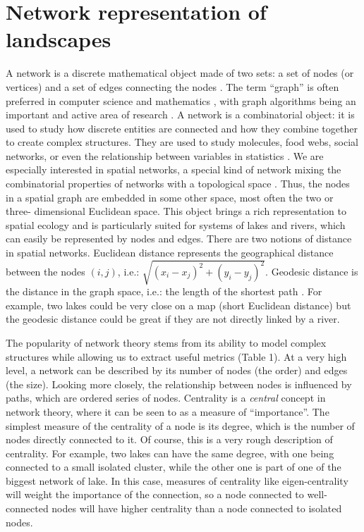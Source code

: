 \documentclass[12pt]{article}
\begin{document}
\section*{Network representation of landscapes}

A network is a discrete mathematical object made of two sets: a set of nodes
(or vertices) and a set of edges connecting the nodes \parencite{new10}. The
term ``graph'' is often preferred in computer science and mathematics
\parencite{gro06}, with graph algorithms being an important and active area of
research \parencite{sed01}. A network is a combinatorial object: it is used to study
how discrete entities are connected and how they combine together to create
complex structures. They are used to study molecules, food webs, social
networks, or even the relationship between variables in statistics
\parencite{wri21,new10}. We are especially interested in spatial networks, a special
kind of network mixing the combinatorial properties of networks with a
topological space \parencite{kob94}. Thus, the nodes in a spatial graph are
embedded in some other space, most often the two or three- dimensional Euclidean
space. This object brings a rich representation to spatial ecology and is
particularly suited for systems of lakes and rivers, which can easily be
represented by nodes and edges. There are two notions of distance in spatial
networks. Euclidean distance represents the geographical distance between the
nodes $(i, j)$, i.e.: $\sqrt{(x_i - x_j)^2 + (y_i - y_ j)^2}$. Geodesic
distance is the distance in the graph space, i.e.: the length of the shortest
path \parencite{dij59}. For example, two lakes could be very close on a map (short
Euclidean distance) but the geodesic distance could be great if they are not
directly linked by a river.

The popularity of network theory stems from its ability to model complex
structures while allowing us to extract useful metrics (Table 1). At a very high
level, a network can be described by its number of nodes (the order) and 
edges (the size). Looking more closely, the relationship between
nodes is influenced by paths, which are ordered series of nodes. Centrality
is a \emph{central} concept in network theory, where it can be seen
to as a measure of ``importance''. The simplest measure of the centrality of a
node is its degree, which is the number of nodes directly connected to it. Of
course, this is a very rough description of centrality. For example, two lakes
can have the same degree, with one being connected to a small isolated cluster,
while the other one is part of one of the biggest network of lake. In this case,
measures of centrality like eigen-centrality will weight the importance of the
connection, so a node connected to well-connected nodes will have higher
centrality than a node connected to isolated nodes.
\end{document}
